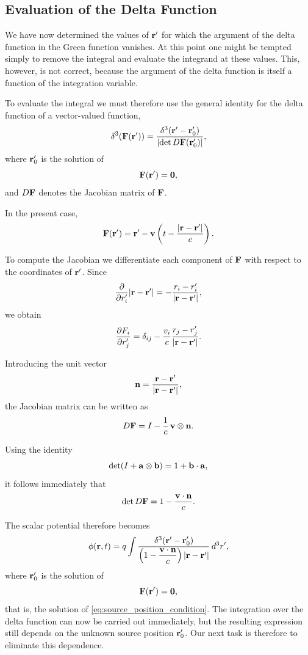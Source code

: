 \documentclass[12pt]{article}
\begin{document}
\subsection{Evaluation of the Delta Function}
We have now determined the values of $\vb r'$ for which the argument of the
delta function in the Green function vanishes. At this point one might be
tempted simply to remove the integral and evaluate the integrand at these
values. This, however, is not correct, because the argument of the delta
function is itself a function of the integration variable.

To evaluate the integral we must therefore use the general identity for the
delta function of a vector-valued function,
\begin{equation}
  \delta^3\!\left(\vb F(\vb r')\right)
  =
  \frac{
    \delta^3\!\left(\vb r'-\vb r'_0\right)
  }{
    \left|\det D\vb F(\vb r'_0)\right|
  },
  \label{eq:delta_function_vector}
\end{equation}
where $\vb r'_0$ is the solution of
\[
\vb F(\vb r')=\vb0,
\]
and $D\vb F$ denotes the Jacobian matrix of $\vb F$.

In the present case,
\begin{equation}
  \vb F(\vb r')
  =
  \vb r'
  -
  \vb v
  \left(
    t
    -
    \frac{\abs{\vb r-\vb r'}}{c}
  \right).
  \label{eq:green_function_argument}
\end{equation}

To compute the Jacobian we differentiate each component of $\vb F$ with respect
to the coordinates of $\vb r'$. Since
\[
  \frac{\partial}{\partial r'_i}
  \abs{\vb r-\vb r'}
  =
  -
  \frac{r_i-r'_i}{\abs{\vb r-\vb r'}},
\]
we obtain
\[
  \frac{\partial F_i}{\partial r'_j}
  =
  \delta_{ij}
  -
  \frac{v_i}{c}
  \frac{r_j-r'_j}{\abs{\vb r-\vb r'}}.
\]

Introducing the unit vector
\[
  \vb n
  =
  \frac{\vb r-\vb r'}{\abs{\vb r-\vb r'}},
\]
the Jacobian matrix can be written as
\[
  D\vb F
  =
  I
  -
  \frac{1}{c}\,
  \vb v\otimes\vb n.
\]

Using the identity
\[
\det(I+\vb a\otimes\vb b)=1+\vb b\cdot\vb a,
\]
it follows immediately that
\[
  \det D\vb F
  =
  1
  -
  \frac{\vb v\cdot\vb n}{c}.
\]

The scalar potential therefore becomes
\[
  \phi(\vb r,t)
  =
  q
  \int
  \frac{
    \delta^3\!\left(
      \vb r'
      -
      \vb r'_0
    \right)
  }{
    \left(
      1-\dfrac{\vb v\cdot\vb n}{c}
    \right)
    \abs{\vb r-\vb r'}
  }
  \,d^3r',
\]
where $\vb r'_0$ is the solution of
\[
\vb F(\vb r')=\vb0,
\]
that is, the solution of
\eqref{eq:source_position_condition}. The integration over the delta function
can now be carried out immediately, but the resulting expression still depends
on the unknown source position $\vb r'_0$. Our next task is therefore to
eliminate this dependence.
\end{document}
